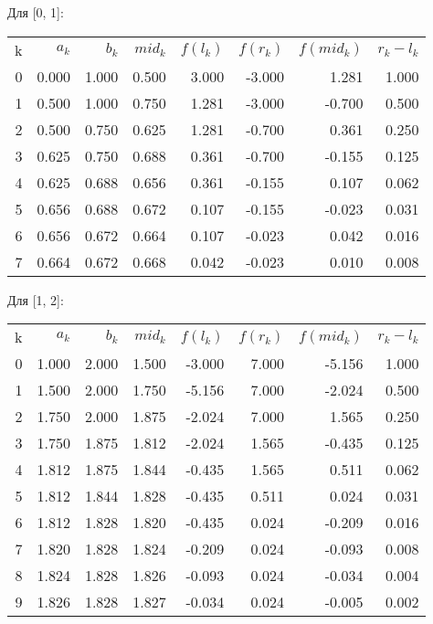 \documentclass[]{article}
\begin{document}
Для [0, 1]:
\begin{center}
\begin{tabular}{ r r r r r r r r }
k & $a_k$ & $b_k$ & $mid_k$ & $f(l_k)$ & $f(r_k)$ & $f(mid_k)$ & $r_k-l_k$\\
0 & 0.000 & 1.000 & 0.500 & 3.000 & -3.000 & 1.281 & 1.000 \\
1 & 0.500 & 1.000 & 0.750 & 1.281 & -3.000 & -0.700 & 0.500 \\
2 & 0.500 & 0.750 & 0.625 & 1.281 & -0.700 & 0.361 & 0.250 \\
3 & 0.625 & 0.750 & 0.688 & 0.361 & -0.700 & -0.155 & 0.125 \\
4 & 0.625 & 0.688 & 0.656 & 0.361 & -0.155 & 0.107 & 0.062 \\
5 & 0.656 & 0.688 & 0.672 & 0.107 & -0.155 & -0.023 & 0.031 \\
6 & 0.656 & 0.672 & 0.664 & 0.107 & -0.023 & 0.042 & 0.016 \\
7 & 0.664 & 0.672 & 0.668 & 0.042 & -0.023 & 0.010 & 0.008 \\
\end{tabular}
\end{center}

Для [1, 2]:
\begin{center}
\begin{tabular}{ r r r r r r r r }
k & $a_k$ & $b_k$ & $mid_k$ & $f(l_k)$ & $f(r_k)$ & $f(mid_k)$ & $r_k-l_k$\\
0 & 1.000 & 2.000 & 1.500 & -3.000 & 7.000 & -5.156 & 1.000 \\
1 & 1.500 & 2.000 & 1.750 & -5.156 & 7.000 & -2.024 & 0.500 \\
2 & 1.750 & 2.000 & 1.875 & -2.024 & 7.000 & 1.565 & 0.250 \\
3 & 1.750 & 1.875 & 1.812 & -2.024 & 1.565 & -0.435 & 0.125 \\
4 & 1.812 & 1.875 & 1.844 & -0.435 & 1.565 & 0.511 & 0.062 \\
5 & 1.812 & 1.844 & 1.828 & -0.435 & 0.511 & 0.024 & 0.031 \\
6 & 1.812 & 1.828 & 1.820 & -0.435 & 0.024 & -0.209 & 0.016 \\
7 & 1.820 & 1.828 & 1.824 & -0.209 & 0.024 & -0.093 & 0.008 \\
8 & 1.824 & 1.828 & 1.826 & -0.093 & 0.024 & -0.034 & 0.004 \\
9 & 1.826 & 1.828 & 1.827 & -0.034 & 0.024 & -0.005 & 0.002 \\
\end{tabular}
\end{center}

\begin{center}
\end{center}
\end{document}
